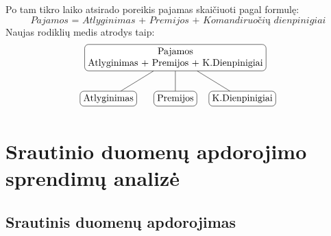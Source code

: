 \documentclass{VUMIFPSbakalaurinis}
\begin{document}
\begin{itemize}
\[    \]\par
     Po tam tikro laiko atsirado poreikis pajamas skaičiuoti pagal formulę: \[\textit{Pajamos = Atlyginimas + Premijos + Komandiruočių dienpinigiai}\] Naujas rodiklių medis atrodys taip: 
     \[	
        \begin{tikzpicture}[sibling distance=7em,	
            every node/.style = {shape=rectangle, rounded corners,	
                                 draw, align=center,	
                                 top color=white, bottom color=white}]	
            \node {Pajamos\\Atlyginimas + Premijos + K.Dienpinigiai}	
                    child { node {Atlyginimas} }	
                    child { node {Premijos} } 
                    child { node {K.Dienpinigiai} };	
        \end{tikzpicture} 	
    \]
\end{itemize} 

\noindent 
\section{Srautinio duomenų apdorojimo sprendimų analizė}

\subsection{Srautinis duomenų apdorojimas} \label{strprocess}
\end{document}
